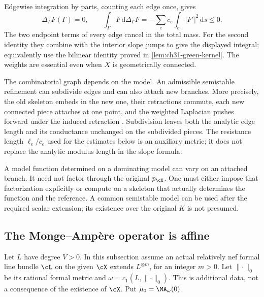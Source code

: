 Edgewise integration by parts, counting each edge once, gives
\begin{equation}
\label{eq:graph-dirichlet-sign}
 \Delta_\Gamma F(\Gamma)=0,\qquad
 \int_\Gamma F\,\mathrm d\Delta_\Gamma F
       =-\sum_e c_e\int_e|F'|^2\,\mathrm ds\leq0.
\end{equation}
The two endpoint terms of every edge cancel in the total mass.
For the second identity they combine with the interior slope jumps
to give the displayed integral; equivalently use the bilinear
identity proved in \cref{lem:ch31-green-kernel}.
The weights are essential even when \(X\) is geometrically connected.

\begin{remark}
\label{rem:ch31-lengths}
The combinatorial graph depends on the model.  An admissible
semistable refinement can subdivide edges and can also attach new
branches.  More precisely, the old skeleton embeds in the new one,
their retractions commute, each new connected piece attaches at one
point, and the weighted Laplacian pushes forward under the induced
retraction \cite[Proposition~2.2.26]{Thu05}.
Subdivision leaves both the analytic edge length and its conductance
unchanged on the subdivided pieces.  The resistance length
\(\ell_e/c_e\) used for the estimates below is an auxiliary metric;
it does not replace the analytic modulus length in the slope formula.

A model function determined on a dominating model can vary on an
attached branch.  It need not factor through the original \(p_{\cX}\).
One must either impose that factorization explicitly or compute on
a skeleton that actually determines the function and the reference.
A common semistable model can be used after the required scalar
extension; its existence over the original \(K\) is not presumed.
\end{remark}

\subsection{The Monge--Amp\`ere operator is affine}
\label{sec:ch31-curve-affine}

Let \(L\) have degree \(V>0\).  In this subsection assume an actual
relatively nef formal line bundle \(\cL\) on the given \(\cX\)
extends \(L^{\otimes m}\), for an integer \(m>0\).
Let \(\lVert\cdot\rVert_0\) be its rational formal metric and
\(\omega=c_1(L,\lVert\cdot\rVert_0)\).
This is additional data, not a consequence of the existence of
\(\cX\).  Put \(\mu_0=\MA_\omega(0)\).

